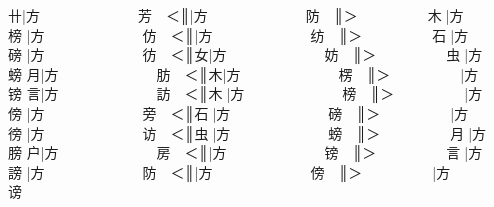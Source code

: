{\cjk{}{\cnsym{}　　　　　}卄}|{\cjk{}方{\cnsym{}　　　　　　　}芳{\cnsym{}　}＜}║{\cjk{}{\cnsym{}　　　　　　}}|{\cjk{}方{\cnsym{}　　　　　　　}防{\cnsym{}　}}║{\cjk{}＞{\cnsym{}　　　　　}木{\cnjzr{}}}|{\cjk{}方{\cnsym{}　　　　　　　}榜} 
{\cjk{}{\cnsym{}　　　　　}}|{\cjk{}方{\cnsym{}　　　　　　　}仿{\cnsym{}　}＜}║{\cjk{}{\cnsym{}　　　　　　}}|{\cjk{}方{\cnsym{}　　　　　　　}纺{\cnsym{}　}}║{\cjk{}＞{\cnsym{}　　　　　}石{\cnjzr{}}}|{\cjk{}方{\cnsym{}　　　　　　　}磅} 
{\cjk{}{\cnsym{}　　　　　}}|{\cjk{}方{\cnsym{}　　　　　　　}彷{\cnsym{}　}＜}║{\cjk{}{\cnsym{}　　　　　　}女}|{\cjk{}方{\cnsym{}　　　　　　　}妨{\cnsym{}　}}║{\cjk{}＞{\cnsym{}　　　　　}虫{\cnjzr{}}}|{\cjk{}方{\cnsym{}　　　　　　　}螃} 
{\cjk{}{\cnsym{}　　　　　}月}|{\cjk{}方{\cnsym{}　　　　　　　}肪{\cnsym{}　}＜}║{\cjk{}{\cnsym{}　　　　　}木}|{\cjk{}方{\cnsym{}　　　　　　　}楞{\cnsym{}　}}║{\cjk{}＞{\cnsym{}　　　　　}}|{\cjk{}方{\cnsym{}　　　　　　　}镑} 
{\cjk{}{\cnsym{}　　　　　}言}|{\cjk{}方{\cnsym{}　　　　　　　}訪{\cnsym{}　}＜}║{\cjk{}{\cnsym{}　　　　　}木{\cnjzr{}}}|{\cjk{}方{\cnsym{}　　　　　　　}榜{\cnsym{}　}}║{\cjk{}＞{\cnsym{}　　　　　}}|{\cjk{}方{\cnsym{}　　　　　　　}傍} 
{}|{\cjk{}方{\cnsym{}　　　　　　　}旁{\cnsym{}　}＜}║{\cjk{}{\cnsym{}　　　　　}石{\cnjzr{}}}|{\cjk{}方{\cnsym{}　　　　　　　}磅{\cnsym{}　}}║{\cjk{}＞{\cnsym{}　　　　　}}|{\cjk{}方{\cnsym{}　　　　　　　}徬} 
{\cjk{}{\cnsym{}　　　　　}}|{\cjk{}方{\cnsym{}　　　　　　　}访{\cnsym{}　}＜}║{\cjk{}{\cnsym{}　　　　　}虫{\cnjzr{}}}|{\cjk{}方{\cnsym{}　　　　　　　}螃{\cnsym{}　}}║{\cjk{}＞{\cnsym{}　　　　　}月{\cnjzr{}}}|{\cjk{}方{\cnsym{}　　　　　　　}膀} 
{\cjk{}{\cnsym{}　　　　　}户}|{\cjk{}方{\cnsym{}　　　　　　　}房{\cnsym{}　}＜}║{\cjk{}{\cnsym{}　　　　　}}|{\cjk{}方{\cnsym{}　　　　　　　}镑{\cnsym{}　}}║{\cjk{}＞{\cnsym{}　　　　　}言{\cnjzr{}}}|{\cjk{}方{\cnsym{}　　　　　　　}謗} 
{\cjk{}{\cnsym{}　　　　　}}|{\cjk{}方{\cnsym{}　　　　　　　}防{\cnsym{}　}＜}║{\cjk{}{\cnsym{}　　　　　}}|{\cjk{}方{\cnsym{}　　　　　　　}傍{\cnsym{}　}}║{\cjk{}＞{\cnsym{}　　　　　}}|{\cjk{}方{\cnsym{}　　　　　　　}谤} 
